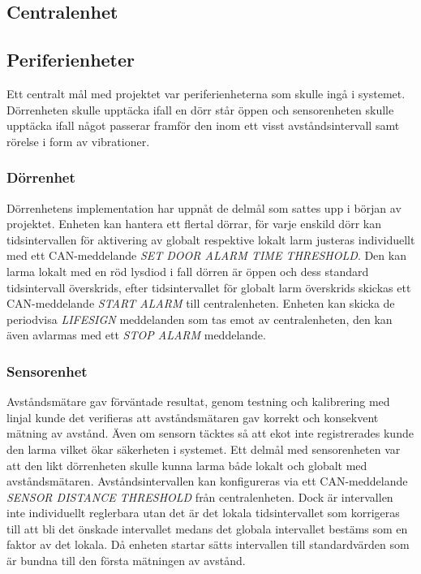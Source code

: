 \documentclass{article}
\begin{document}
\subsection{Centralenhet}

\subsection{Periferienheter}
Ett centralt mål med projektet var periferienheterna som skulle ingå i systemet. Dörrenheten skulle upptäcka ifall en dörr står öppen och sensorenheten skulle upptäcka ifall något passerar framför den inom ett visst avståndsintervall samt rörelse i form av vibrationer.

\subsubsection{Dörrenhet}
Dörrenhetens implementation har uppnåt de delmål som sattes upp i början av projektet. Enheten kan hantera ett flertal dörrar, för varje enskild dörr kan tidsintervallen för aktivering av globalt respektive lokalt larm justeras individuellt med ett CAN-meddelande \emph{SET DOOR ALARM TIME THRESHOLD}. Den kan larma lokalt med en röd lysdiod i fall dörren är öppen och dess standard tidsintervall överskrids, efter tidsintervallet för globalt larm överskrids skickas ett CAN-meddelande \emph{START ALARM} till centralenheten. Enheten kan skicka de periodvisa \emph{LIFESIGN} meddelanden som tas emot av centralenheten, den kan även avlarmas med ett \emph{STOP ALARM} meddelande.

\subsubsection{Sensorenhet}
Avståndsmätare gav förväntade resultat, genom testning och kalibrering med linjal kunde det verifieras att avståndsmätaren gav korrekt och konsekvent mätning av avstånd. Även om sensorn täcktes så att ekot inte registrerades kunde den larma vilket ökar säkerheten i systemet. Ett delmål med sensorenheten var att den likt dörrenheten skulle kunna larma både lokalt och globalt med avståndsmätaren. Avståndsintervallen kan konfigureras via ett CAN-meddelande \emph{SENSOR DISTANCE THRESHOLD} från centralenheten. Dock är intervallen inte individuellt reglerbara utan det är det lokala tidsintervallet som korrigeras till att bli det önskade intervallet medans det globala intervallet bestäms som en faktor av det lokala. Då enheten startar sätts intervallen till standardvärden som är bundna till den första mätningen av avstånd.
\end{document}
